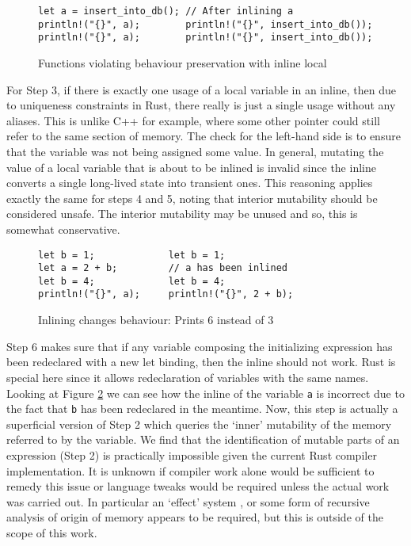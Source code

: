 \begin{figure}[h]
\begin{verbatim}
let a = insert_into_db(); // After inlining a
println!("{}", a);        println!("{}", insert_into_db());
println!("{}", a);        println!("{}", insert_into_db());
\end{verbatim}
\caption{Functions violating behaviour preservation with inline local}
\label{Fig:funcinline}
\end{figure}

For Step 3, if there is exactly one usage of a local variable in an inline, then due to uniqueness constraints in Rust, there really is just a single usage without any aliases. This is unlike C++ for example, where some other pointer could still refer to the same section of memory. The check for the left-hand side is to ensure that the variable was not being assigned some value. In general, mutating the value of a local variable that is about to be inlined is invalid since the inline converts a single long-lived state into transient ones. This reasoning applies exactly the same for steps 4 and 5, noting that interior mutability should be considered unsafe. The interior mutability may be unused and so, this is somewhat conservative.

\begin{figure}[h]
\begin{verbatim}
let b = 1;             let b = 1;
let a = 2 + b;         // a has been inlined
let b = 4;             let b = 4;
println!("{}", a);     println!("{}", 2 + b);
\end{verbatim}
\caption{Inlining changes behaviour: Prints 6 instead of 3}
\label{Fig:newlet}
\end{figure}

Step 6 makes sure that if any variable composing the initializing expression has been redeclared with a new let binding, then the inline should not work. Rust is special here since it allows redeclaration of variables with the same names. Looking at Figure \ref{Fig:newlet} we can see how the inline of the variable {\verb|a|} is incorrect due to the fact that {\verb|b|} has been redeclared in the meantime. Now, this step is actually a superficial version of Step 2 which queries the `inner' mutability of the memory referred to by the variable. We find that the identification of mutable parts of an expression (Step 2) is practically impossible given the current Rust compiler implementation. It is unknown if compiler work alone would be sufficient to remedy this issue or language tweaks would be required unless the actual work was carried out. In particular an `effect' system \cite{effects}, or some form of recursive analysis of origin of memory appears to be required, but this is outside of the scope of this work.

